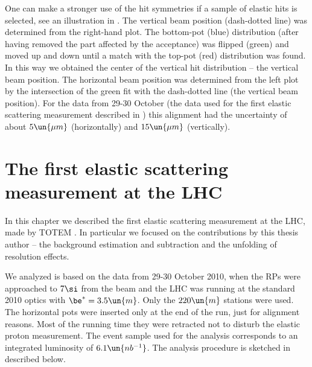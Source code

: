 One can make a stronger use of the hit symmetries if a sample of elastic hits is selected, see an illustration in . The vertical beam position (dash-dotted line) was determined from the right-hand plot. The bottom-pot (blue) distribution (after having removed the part affected by the acceptance) was flipped (green) and moved up and down until a match with the top-pot (red) distribution was found. In this way we obtained the center of the vertical hit distribution -- the vertical beam position. The horizontal beam position was determined from the left plot by the intersection of the green fit with the dash-dotted line (the vertical beam position). For the data from 29-30 October (the data used for the first elastic scattering measurement described in ) this alignment had the uncertainty of about $5\un{\mu m}$ (horizontally) and $15\un{\mu m}$ (vertically).


\chapter[felm]{The first elastic scattering measurement at the LHC}

In this chapter we described the first elastic scattering measurement at the LHC, made by TOTEM . In particular we focused on the contributions by this thesis author -- the background estimation and subtraction and the unfolding of resolution effects.


We analyzed is based on the data from 29-30 October 2010, when the RPs were approached to $7\si$ from the beam and the LHC was running at the standard 2010 optics with $\be^* = 3.5\un{m}$. Only the $220\un{m}$ stations were used. The horizontal pots were inserted only at the end of the run, just for alignment reasons. Most of the running time they were retracted not to disturb the elastic proton measurement. The event sample used for the analysis corresponds to an integrated luminosity of $6.1\un{nb^{-1}}$. The analysis procedure is sketched in  described below.


